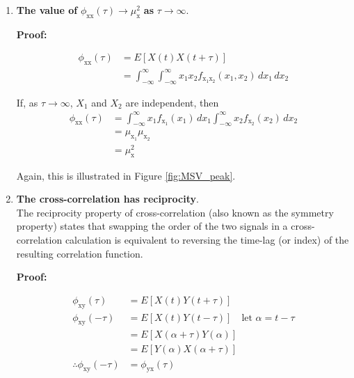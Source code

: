 \documentclass[12pt]{book}
\theoremstyle{definition}
\begin{document}
\begin{enumerate}
\item \textbf{The value of }\(\phi_\mathrm{xx} (\tau) \rightarrow \mu_\mathrm{x}^2 \) \textbf{ as }  \( \tau \rightarrow \infty\).

\bigskip
\textbf{Proof:}

\[
\begin{split}
    \phi_\mathrm{xx}(\tau) & = E[X(t) X(t+ \tau)]\\
                    & = \int_{-\infty}^{\infty}\int_{-\infty}^{\infty}x_1 x_2 f_\mathrm{x_1 x_2}(x_1,x_2) \, dx_1 \, dx_2
\end{split}
\]

If, as \(\tau \rightarrow \infty\), \(X_1\) and \(X_2\) are independent, then 
\[
\begin{split}
    \phi_\mathrm{xx}(\tau) & = \int_{-\infty}^{\infty}x_1  f_\mathrm{x_1}(x_1) \, dx_1 \int_{-\infty}^{\infty}x_2 f_\mathrm{x_2}(x_2) \, dx_2 \\
                    & = \mu_\mathrm{x_1}\mu_\mathrm{x_2} \\
                    & = \mu_\mathrm{x}^2
\end{split}
\]

Again, this is illustrated in Figure \ref{fig:MSV_peak}.

\item \textbf{The cross-correlation has reciprocity}.\\

The reciprocity property of cross-correlation (also known as the symmetry property) states that swapping the order of the two signals in a cross-correlation calculation is equivalent to reversing the time-lag (or index) of the resulting correlation function. 

\bigskip
\textbf{Proof:}

\[
\begin{split}
    \phi_\mathrm{xy}(\tau) & = E[X(t)Y(t + \tau)]\\
    \phi_\mathrm{xy}(-\tau) & = E[X(t)Y(t - \tau)] \quad \text{let } \alpha=t-\tau \\
                    & = E[X(\alpha + \tau)Y(\alpha)]\\
                    & = E[Y(\alpha)X(\alpha + \tau)]\\
     \therefore \phi_\mathrm{xy}(-\tau)               & = \phi_\mathrm{yx}(\tau)
\end{split}
\]
\end{enumerate}

\bigskip
\end{document}
